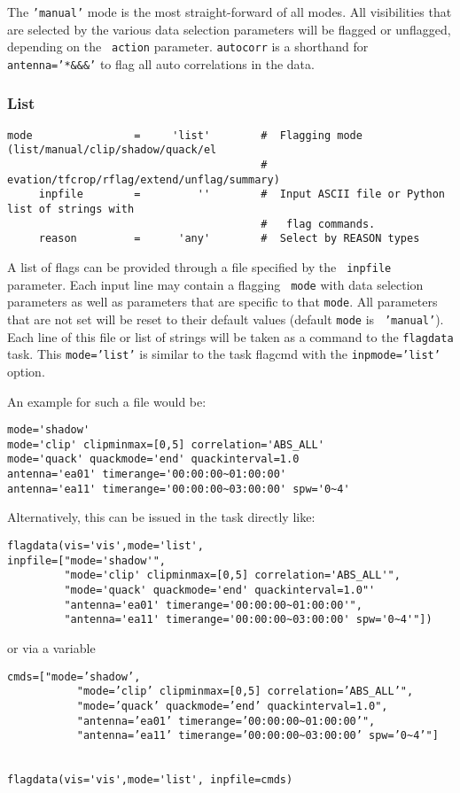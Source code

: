 The {\tt 'manual'} mode is the most straight-forward of all modes. All
visibilities that are selected by the various data selection
parameters will be flagged or unflagged, depending on the {\tt
  action} parameter. {\tt autocorr} is a shorthand for {\tt
  antenna='*\&\&\&'} to flag all auto correlations in the data.


\subsubsection{List}
\label{section:edit.flagdata.mode.list}


\small
\begin{verbatim}
mode                =     'list'        #  Flagging mode (list/manual/clip/shadow/quack/el
                                        #   evation/tfcrop/rflag/extend/unflag/summary)
     inpfile        =         ''        #  Input ASCII file or Python list of strings with
                                        #   flag commands.
     reason         =      'any'        #  Select by REASON types
\end{verbatim}
\normalsize

A list of flags can be provided through a file specified by the {\tt
  inpfile} parameter.  Each input line may contain a flagging {\tt
  mode} with data selection parameters as well as parameters that are
specific to that {\tt mode}. All parameters that are not set will be
reset to their default values (default {\tt mode} is {\tt
  'manual'}). Each line of this ﬁle or list of strings will be taken
as a command to the {\tt flagdata} task. This {\tt mode=’list’} is similar to the
task flagcmd with the {\tt inpmode=’list’} option. 

An example for such a file would be: 

\small
\begin{verbatim}
mode='shadow'
mode='clip' clipminmax=[0,5] correlation='ABS_ALL'
mode='quack' quackmode='end' quackinterval=1.0
antenna='ea01' timerange='00:00:00~01:00:00'
antenna='ea11' timerange='00:00:00~03:00:00' spw='0~4'
\end{verbatim}
\normalsize

Alternatively, this can be issued in the task directly like:

\small
\begin{verbatim}
flagdata(vis='vis',mode='list',
inpfile=["mode='shadow'",
         "mode='clip' clipminmax=[0,5] correlation='ABS_ALL'",
         "mode='quack' quackmode='end' quackinterval=1.0"'
         "antenna='ea01' timerange='00:00:00~01:00:00'",
         "antenna='ea11' timerange='00:00:00~03:00:00' spw='0~4'"])
\end{verbatim}
\normalsize
or via a variable
\small
\begin{verbatim}
cmds=["mode=’shadow’,
           "mode=’clip’ clipminmax=[0,5] correlation=’ABS_ALL’",
           "mode=’quack’ quackmode=’end’ quackinterval=1.0",
           "antenna=’ea01’ timerange=’00:00:00~01:00:00’",
           "antenna=’ea11’ timerange=’00:00:00~03:00:00’ spw=’0~4’"]


flagdata(vis='vis',mode='list', inpfile=cmds)
\end{verbatim}
\normalsize

